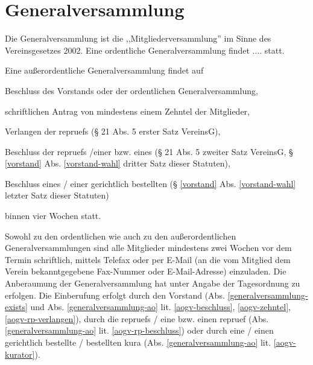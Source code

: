 \documentclass{article}
\begin{document}
\section{Generalversammlung}\label{generalversammlung}
\begin{absatz}
    \item \label{generalversammlung-exists} Die Generalversammlung ist die ,,Mitgliederversammlung'' im Sinne des Vereinsgesetzes 2002. Eine ordentliche Generalversammlung findet
    ....  statt.
    \item \label{generalversammlung-ao} Eine außerordentliche Generalversammlung findet auf
    \begin{littera}
        \item \label{aogv-beschluss} Beschluss des Vorstands oder der ordentlichen Generalversammlung,
        \item \label{aogv-zehntel} schriftlichen Antrag von mindestens einem Zehntel der Mitglieder,
        \item \label{aogv-rp-verlangen} Verlangen der \glspl{repruef} (§ 21 Abs. 5 erster Satz VereinsG),
        \item \label{aogv-rp-beschluss} Beschluss der \glspl{repruef} /einer bzw. eines  (§ 21 Abs. 5 zweiter Satz VereinsG, § \ref{vorstand} Abs. \ref{vorstand-wahl} dritter Satz dieser Statuten),
        \item \label{aogv-kurator} Beschluss eines / einer gerichtlich bestellten  (§ \ref{vorstand} Abs. \ref{vorstand-wahl} letzter Satz dieser Statuten)
    \end{littera}
    binnen vier Wochen statt.
    \item Sowohl zu den ordentlichen wie auch zu den außerordentlichen Generalversammlungen sind alle Mitglieder mindestens zwei Wochen vor dem Termin schriftlich, mittels Telefax oder per E-Mail (an die vom Mitglied dem Verein bekanntgegebene Fax-Nummer oder E-Mail-Adresse) einzuladen. Die Anberaumung der Generalversammlung hat unter Angabe der Tagesordnung zu erfolgen. Die Einberufung erfolgt durch den Vorstand (Abs. \ref{generalversammlung-exists} und Abs. \ref{generalversammlung-ao} lit. \ref{aogv-beschluss}, \ref{aogv-zehntel}, \ref{aogv-rp-verlangen}), durch die \glspl{repruef} / eine bzw. einen \gls{repruef} (Abs. \ref{generalversammlung-ao} lit. \ref{aogv-rp-beschluss}) oder durch eine / einen gerichtlich bestellte / bestellten \gls{kura} (Abs. \ref{generalversammlung-ao} lit. \ref{aogv-kurator}).

\end{absatz}
\end{document}
